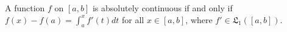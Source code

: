 A function $f$ on $[a, b]$ is absolutely continuous if and only if $f(x) - f(a) = \int_a^x f'(t) dt$ for all $x \in [a, b]$, where $f' \in \mathfrak{L}_1([a, b])$.
